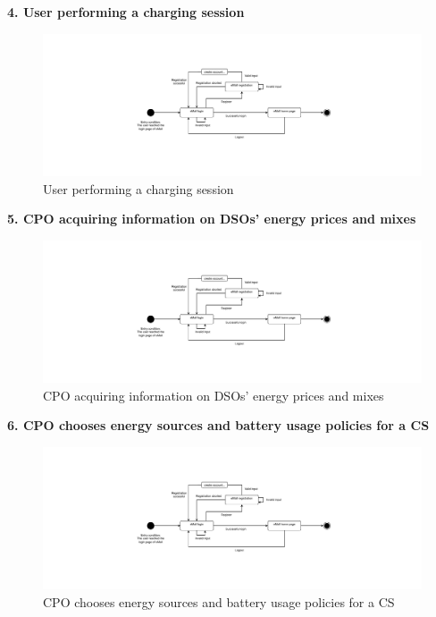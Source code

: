 \documentclass[11pt]{article}
\begin{document}
\begin{description}
    \newpage
    
    \item \textbf{4. User performing a charging session}
    \begin{figure}[!ht]
        \includegraphics[page={4}, width=\linewidth, trim=2cm 4cm 2cm 4cm, clip]{StateCharts.pdf}
        \caption{User performing a charging session}
    \end{figure}
    
    \item \textbf{5. CPO acquiring information on DSOs' energy prices and mixes}
    \begin{figure}[!ht]
        \includegraphics[page={5}, width=\linewidth, trim=1cm 4cm 1cm 4cm, clip]{StateCharts.pdf}
        \caption{CPO acquiring information on DSOs' energy prices and mixes}
    \end{figure}
    
    \item \textbf{6. CPO chooses energy sources and battery usage policies for a CS}
    \begin{figure}[!ht]
        \includegraphics[page={6}, width=\linewidth, trim=6cm 5cm 6cm 5cm, clip]{StateCharts.pdf}
        \caption{CPO chooses energy sources and battery usage policies for a CS}
    \end{figure}
    

\end{description}
\end{document}
